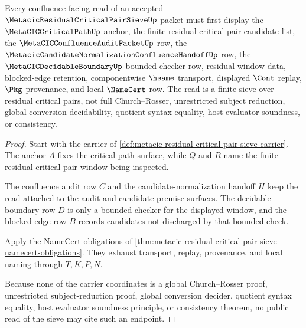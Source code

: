 \begin{theorem}
\label{thm:metacic-residual-critical-pair-sieve-boundary}
Every confluence-facing read of an accepted $\MetacicResidualCriticalPairSieveUp$ packet must first display the $\MetaCICCriticalPathUp$ anchor, the finite residual critical-pair candidate list, the $\MetaCICConfluenceAuditPacketUp$ row, the $\MetacicCandidateNormalizationConfluenceHandoffUp$ row, the $\MetaCICDecidableBoundaryUp$ bounded checker row, residual-window data, blocked-edge retention, componentwise $\hsame$ transport, displayed $\Cont$ replay, $\Pkg$ provenance, and local $\NameCert$ row. The read is a finite sieve over residual critical pairs, not full Church--Rosser, unrestricted subject reduction, global conversion decidability, quotient syntax equality, host evaluator soundness, or consistency.
\end{theorem}
\begin{proof}
Start with the carrier of \autoref{def:metacic-residual-critical-pair-sieve-carrier}. The anchor $A$ fixes the critical-path surface, while $Q$ and $R$ name the finite residual critical-pair window being inspected.

The confluence audit row $C$ and the candidate-normalization handoff $H$ keep the read attached to the audit and candidate premise surfaces. The decidable boundary row $D$ is only a bounded checker for the displayed window, and the blocked-edge row $B$ records candidates not discharged by that bounded check.

Apply the NameCert obligations of \autoref{thm:metacic-residual-critical-pair-sieve-namecert-obligations}. They exhaust transport, replay, provenance, and local naming through $T,K,P,N$.

Because none of the carrier coordinates is a global Church--Rosser proof, unrestricted subject-reduction proof, global conversion decider, quotient syntax equality, host evaluator soundness principle, or consistency theorem, no public read of the sieve may cite such an endpoint.
\end{proof}


